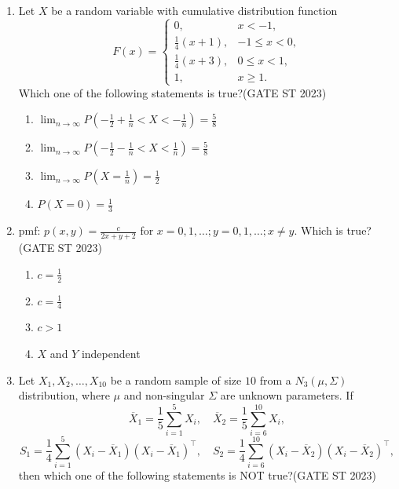 \documentclass[journal]{IEEEtran}
\begin{document}
\begin{enumerate}[label=\textbf{Q.\arabic*.}, start=11, align=left, itemsep=2em]
\item Let $X$ be a random variable with cumulative distribution function
\[
F(x) =
\begin{cases}
0, & x < -1, \\[4pt]
\frac14(x+1), & -1 \le x < 0, \\[4pt]
\frac14(x+3), & 0 \le x < 1, \\[4pt]
1, & x \ge 1.
\end{cases}
\]
Which one of the following statements is true?\hfill(GATE ST 2023)
\begin{enumerate}
    \item $\displaystyle \lim_{n \to \infty} P\!\left(-\frac12 + \frac1n < X < -\frac1n\right) = \frac{5}{8}$
    \item $\displaystyle \lim_{n \to \infty} P\!\left(-\frac12 - \frac1n < X < \frac1n\right) = \frac{5}{8}$
    \item $\displaystyle \lim_{n \to \infty} P\!\left(X = \frac1n\right) = \frac12$
    \item $P(X = 0) = \frac13$
\end{enumerate}

\item pmf: $p(x,y) = \frac{c}{2x+y+2}$ for $x=0,1,\dots; y=0,1,\dots; x\ne y$. Which is true?\hfill(GATE ST 2023)
\begin{enumerate}
\item $c = \frac12$
\item $c = \frac14$
\item $c > 1$
\item $X$ and $Y$ independent
\end{enumerate}

\item Let $X_1, X_2, \dots, X_{10}$ be a random sample of size $10$ from a $N_3(\mu,\Sigma)$
distribution, where $\mu$ and non-singular $\Sigma$ are unknown parameters. If  
\[
\overline{X}_1 = \frac{1}{5} \sum_{i=1}^5 X_i, 
\quad
\overline{X}_2 = \frac{1}{5} \sum_{i=6}^{10} X_i,
\]
\[
S_1 = \frac{1}{4} \sum_{i=1}^5 (X_i - \overline{X}_1)(X_i - \overline{X}_1)^\top, 
\quad
S_2 = \frac{1}{4} \sum_{i=6}^{10} (X_i - \overline{X}_2)(X_i - \overline{X}_2)^\top,
\]
then which one of the following statements is NOT true?\hfill(GATE ST 2023)


\end{enumerate}
\end{document}
